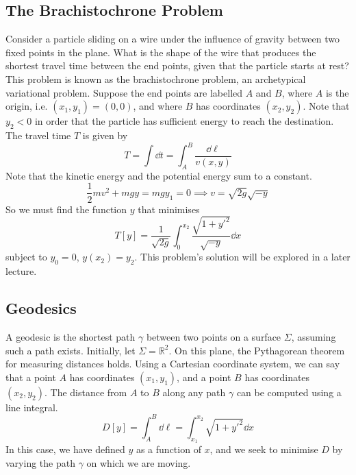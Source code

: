 \subsection{The Brachistochrone Problem}
Consider a particle sliding on a wire under the influence of gravity between two fixed points in the plane.
What is the shape of the wire that produces the shortest travel time between the end points, given that the particle starts at rest?
This problem is known as the brachistochrone problem, an archetypical variational problem.
Suppose the end points are labelled \(A\) and \(B\), where \(A\) is the origin, i.e.
\((x_1, y_1) = (0, 0)\), and where \(B\) has coordinates \((x_2, y_2)\).
Note that \(y_2 < 0\) in order that the particle has sufficient energy to reach the destination.
The travel time \(T\) is given by
\[
	T = \int \dd{t} = \int_A^B \frac{\dd{\ell}}{v(x, y)}
\]
Note that the kinetic energy and the potential energy sum to a constant.
\[
	\frac{1}{2}mv^2 + mgy = mgy_1 = 0 \implies v = \sqrt{2g}\sqrt{-y}
\]
So we must find the function \(y\) that minimises
\[
	T[y] = \frac{1}{\sqrt{2g}} \int_0^{x_2} \frac{\sqrt{1+y'^2}}{\sqrt{-y}}\dd{x}
\]
subject to \(y_0 = 0\), \(y(x_2) = y_2\).
This problem's solution will be explored in a later lecture.

\subsection{Geodesics}
A geodesic is the shortest path \(\gamma\) between two points on a surface \(\Sigma\), assuming such a path exists.
Initially, let \(\Sigma = \mathbb R^2\).
On this plane, the Pythagorean theorem for measuring distances holds.
Using a Cartesian coordinate system, we can say that a point \(A\) has coordinates \((x_1, y_1)\), and a point \(B\) has coordinates \((x_2, y_2)\).
The distance from \(A\) to \(B\) along any path \(\gamma\) can be computed using a line integral.
\[
	D[y] = \int_A^B \dd{\ell} = \int_{x_1}^{x_2} \sqrt{1+y'^2}\dd{x}
\]
In this case, we have defined \(y\) as a function of \(x\), and we seek to minimise \(D\) by varying the path \(\gamma\) on which we are moving.

